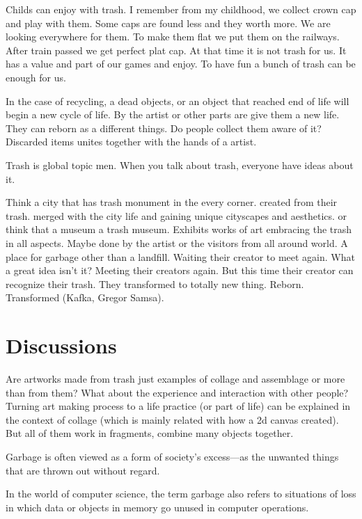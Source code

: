 Childs can enjoy with trash. I remember from my childhood, we collect crown cap and play with them. Some caps are found less and they worth more. We are looking everywhere for them. To make them flat we put them on the railways. After train passed we get perfect plat cap. At that time it is not trash for us. It has a value and part of our games and enjoy. To have fun a bunch of trash can be enough for us.

In the case of recycling, a dead objects, or an object that reached end of life will begin a new cycle of life. By the artist or other parts are give them a new life. They can reborn as a different things. Do people collect them aware of it? Discarded items unites together with the hands of a artist. 

Trash is global topic men. When you talk about trash, everyone have ideas about it. 

Think a city that has trash monument in the every corner. created from their trash. merged with the city life and gaining unique cityscapes and aesthetics. or think that a museum a trash museum. Exhibits works of art embracing the trash in all aspects. Maybe done by the artist or the visitors from all around world. A place for garbage other than a landfill. Waiting their creator to meet again. What a great idea isn't it? Meeting their creators again. But this time their creator can recognize their trash. They transformed to totally new thing. Reborn. Transformed (Kafka, Gregor Samsa).




\section{Discussions}
Are artworks made from trash just examples of collage and assemblage or more than from them? What about the experience and interaction with other people? Turning art making process to a life practice (or part of life) can be explained in the context of collage (which is mainly related with how a 2d canvas created). But all of them work in fragments, combine many objects together. 

Garbage is often viewed as a form of society’s excess---as the unwanted things that are thrown out without regard. 

In the world of computer science, the term garbage also refers to situations of loss in which data or objects in memory go unused in computer operations.

